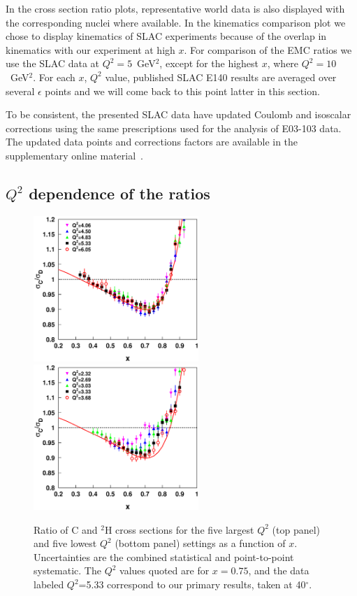 In the cross section ratio plots, representative world data is also displayed
with the corresponding nuclei where available. In the kinematics
comparison plot we chose to display kinematics of SLAC experiments because of
the overlap in kinematics with our experiment at high $x$. For comparison of
the EMC ratios we use the SLAC data at $Q^2=5$~GeV$^2$, except for the highest
$x$, where $Q^2=10$~GeV$^2$. For each $x$, $Q^2$ value, published SLAC E140
results are averaged over several $\epsilon$ points and we will come back to
this point latter in this section.

To be consistent, the presented SLAC data have updated Coulomb and isoscalar
corrections using the same prescriptions used for the analysis of E03-103
data. The updated data points and corrections factors are available in the
supplementary online material~\cite{online_material}.




\subsection{$Q^2$ dependence of the ratios}\label{q2depresult.ssec}

\begin{figure}[htbp]
\includegraphics[width=.44\textwidth,height=55mm]{plots/e03103_C_hiq2_x_scaling.eps}
\includegraphics[width=.44\textwidth,height=55mm]{plots/e03103_C_loq2_x_scaling.eps}
\caption{Ratio of C and $^2$H cross sections for the five largest $Q^2$ (top
panel) and five lowest $Q^2$ (bottom panel) settings as a function of $x$.
Uncertainties are the combined statistical and point-to-point systematic. The
$Q^2$ values quoted are for $x=0.75$, and the data labeled $Q^2$=5.33
correspond to our primary results, taken at 40$^\circ$.
\label{emc_x_C_hiq2dep_fig}}
\end{figure} 

